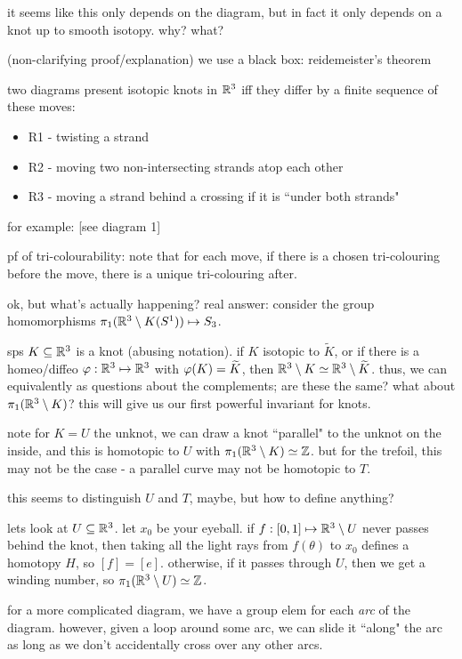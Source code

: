 it seems like this only depends on the diagram, but in fact it only depends on
a knot up to smooth isotopy. why? what?

(non-clarifying proof/explanation) we use a black box: reidemeister's theorem

two diagrams present isotopic knots in $\mathbb{R}^{3}$ iff they differ by a finite
sequence of these moves:
\begin{itemize}
    \item R1 - twisting a strand
    \item R2 - moving two non-intersecting strands atop each other
    \item R3 - moving a strand behind a crossing if it is
        ``under both strands"
\end{itemize}
for example: [see diagram 1]

pf of tri-colourability:
note that for each move, if there is a chosen tri-colouring before the move,
there is a unique tri-colouring after.

ok, but what's actually happening?
real answer: consider the group homomorphisms
$\pi_{1}(\mathbb{R}^{3}\setminus K(S^{1}))\mapsto S_{3}$.

sps $K\subseteq\mathbb{R}^{3}$ is a knot (abusing notation).
if $K$ isotopic to $\tilde{K}$, or if there is a  homeo/diffeo
$\varphi:\mathbb{R}^{3}\mapsto\mathbb{R}^{3}$ with $\varphi(K)=\widetilde{K}$, then
$\mathbb{R}^{3}\setminus K\simeq\mathbb{R}^{3}\setminus\widetilde{K}$.
thus, we can equivalently as questions about the complements; are these the same?
what about $\pi_{1}(\mathbb{R}^{3}\setminus K)$?
this will give us our first powerful invariant for knots.

note for $K=U$ the unknot, we can draw a knot ``parallel" to the unknot on the
inside, and this is homotopic to $U$ with $\pi_{1}(\mathbb{R}^{3}\setminus K)\simeq\mathbb{Z}$.
but for the trefoil, this may not be the case - a parallel curve may not be
homotopic to $T$.

this seems to distinguish $U$ and $T$, maybe, but how to define anything?

lets look at $U\subseteq\mathbb{R}^{3}$. let $x_{0}$ be your eyeball.
if $f:[0,1]\mapsto\mathbb{R}^{3}\setminus U$ never passes behind the knot, then taking all the
light rays from $f(\theta)$ to $x_{0}$ defines a homotopy $H$, so $[f]=[e]$.
otherwise, if it passes through $U$, then we get a winding number, so
$\pi_{1}(\mathbb{R}^{3}\setminus U)\simeq\mathbb{Z}$.

for a more complicated diagram, we have a group elem for each \textit{arc} of the
diagram. however, given a loop around some arc, we can slide it ``along" the arc
as long as we don't accidentally cross over any other arcs.

